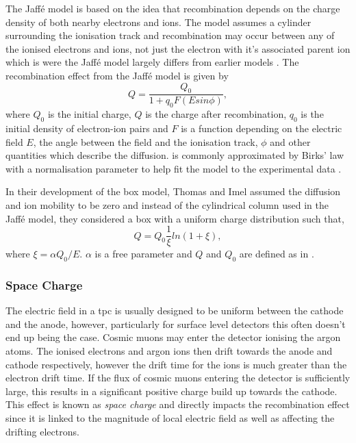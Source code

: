 The Jaff\'{e} model is based on the idea that recombination depends on the charge density of both nearby electrons and ions. The model assumes a cylinder surrounding the ionisation track and recombination may occur between any of the ionised electrons and ions, not just the electron with it's associated parent ion which is were the Jaff\'{e} model largely differs from earlier models \cite{Jaffe_model}. The recombination effect from the Jaff\'{e} model is given by 
\begin{equation}\label{Jaffe}
    Q = \frac{Q_{0}}{1+q_{0}F(Esin\phi)},
\end{equation}
where $Q_0$ is the initial charge, $Q$ is the charge after recombination, $q_0$ is the initial density of electron-ion pairs and $F$ is a function depending on the electric field $E$, the angle between the field and the ionisation track, $\phi$ and other quantities which describe the diffusion.  is commonly approximated by Birks' law with a normalisation parameter to help fit the model to the experimental data \cite{LArTPC_book}. 

In their development of the box model, Thomas and Imel assumed the diffusion and ion mobility to be zero and instead of the cylindrical column used in the Jaff\'{e} model, they considered a box with a uniform charge distribution such that, 
\begin{equation}
    Q = Q_{0}\frac{1}{\xi}ln(1+\xi),
\end{equation}
where $\xi = \alpha Q_0/E$. $\alpha$ is a free parameter and $Q$ and $Q_0$ are defined as in \cite{LArTPC_book}\cite{Recombination_box_model}.


\subsubsection{Space Charge}
The electric field in a \gls{tpc} is usually designed to be uniform between the cathode and the anode, however, particularly for surface level detectors this often doesn't end up being the case. Cosmic muons may enter the detector ionising the argon atoms. The ionised electrons and argon ions then drift towards the anode and cathode respectively, however the drift time for the ions is much greater than the electron drift time. If the flux of cosmic muons entering the detector is sufficiently large, this results in a significant positive charge build up towards the cathode. This effect is known as \textit{space charge} and directly impacts the recombination effect since it is linked to the magnitude of local electric field as well as affecting the drifting electrons.

